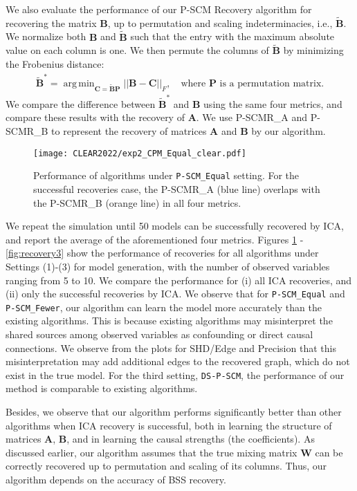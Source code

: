 \documentclass[12pt]{article}
\newcommand{\bA}{\mathbf{A}}
\newcommand{\bB}{\mathbf{B}}
\newcommand{\bW}{\mathbf{W}}
\DeclareMathOperator*{\argmin}{arg\,min}
\begin{document}
We also evaluate the performance of our P-SCM Recovery algorithm for recovering the matrix $\bB$, up to permutation and scaling indeterminacies, i.e., $\tilde{\bB}$.
We normalize both $\bB$ and $\tilde{\bB}$ such that the entry with the maximum absolute value on each column is one. We then permute the columns of $\tilde{\bB}$ by minimizing the Frobenius distance:
\begin{align*}
    \tilde{\bB}^* = \argmin_{\mathbf{C}=\tilde{\bB}\mathbf{P}} ||\bB - \mathbf{C} ||_F,\quad \text{where } \mathbf{P}  \text{ is a permutation matrix.}
\end{align*}
We compare the difference between $\tilde{\bB}^*$ and $\bB$ using the same four metrics, and compare these results with the recovery of $\bA$. We use P-SCMR\_A and P-SCMR\_B to represent the recovery of matrices $\bA$ and $\bB$ by our algorithm.

\begin{figure}[t]
  \centering
  \texttt{[image: CLEAR2022/exp2\_CPM\_Equal\_clear.pdf]}
  \caption{Performance of algorithms under \texttt{P-SCM\_Equal} setting. For the successful recoveries case, the P-SCMR\_A (blue line) overlaps with the P-SCMR\_B (orange line) in all four metrics.}
  \label{fig:recovery1}
\end{figure}

We repeat the simulation until 50 models can be successfully recovered by ICA, and report the average of the aforementioned four metrics. Figures \ref{fig:recovery1} - \ref{fig:recovery3} show the performance of recoveries for all algorithms under Settings (1)-(3) for model generation, with the number of observed variables ranging from 5 to 10. We compare the performance for (i) all ICA recoveries, and (ii) only the successful recoveries by ICA. We observe that for \texttt{P-SCM\_Equal} and \texttt{P-SCM\_Fewer}, our algorithm can learn the model more accurately than the existing algorithms. This is because existing algorithms may misinterpret the shared sources among observed variables as confounding or direct causal connections. We observe from the plots for SHD/Edge and Precision that this misinterpretation may add additional edges to the recovered graph, which do not exist in the true model. For the third setting, \texttt{DS-P-SCM}, the performance of our method is comparable to existing algorithms. 

Besides, we observe that our algorithm performs significantly better than other algorithms when ICA recovery is successful, both in learning the structure of matrices $\bA$, $\bB$, and in learning the causal strengths (the coefficients). As discussed earlier, our algorithm assumes that the true mixing matrix $\bW$ can be correctly recovered up to permutation and scaling of its columns. Thus, our algorithm depends on the accuracy of BSS recovery. 
\end{document}
